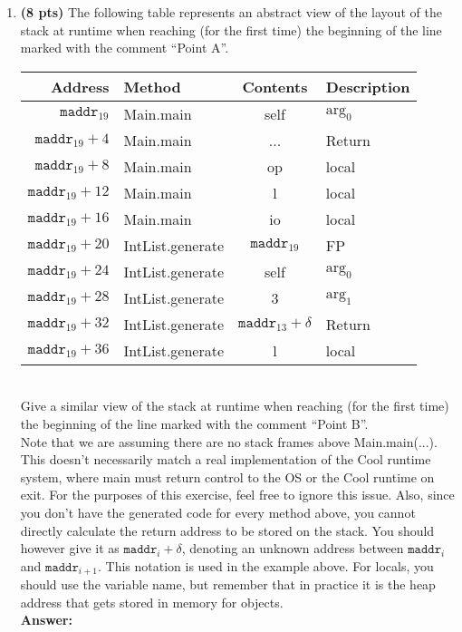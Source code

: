 \documentclass[11pt]{article}
\begin{document}
\begin{enumerate}
\begin{enumerate}
   \newpage

    \item \textbf{(8 pts)} The following table represents an abstract view of the layout of the stack at runtime when reaching (for the first time) the beginning of the line marked with the comment ``Point A''. \\
    
    \begin{tabular}{ | r | l | c | l | }
    \hline
    Address & Method & Contents & Description \\
    \hline
    $\mathtt{maddr}_{19}$ & Main.main & self & $\mbox{arg}_0$ \\
    \hline
    $\mathtt{maddr}_{19}+4$ & Main.main & ... & Return \\
    \hline
    $\mathtt{maddr}_{19}+8$ & Main.main & op & local \\
    \hline
    $\mathtt{maddr}_{19}+12$ & Main.main & l & local \\
    \hline
    $\mathtt{maddr}_{19}+16$ & Main.main & io & local \\
    \hline
    $\mathtt{maddr}_{19}+20$ & IntList.generate & $\mathtt{maddr}_{19}$ & FP \\
    \hline
    $\mathtt{maddr}_{19}+24$ & IntList.generate & self & $\mbox{arg}_0$ \\
    \hline
    $\mathtt{maddr}_{19}+28$ & IntList.generate & 3 & $\mbox{arg}_1$ \\
    \hline
    $\mathtt{maddr}_{19}+32$ & IntList.generate & $\mathtt{maddr}_{13}+\delta$ & Return \\
    \hline
    $\mathtt{maddr}_{19}+36$ & IntList.generate & l & local \\
    \hline
    \end{tabular} \\
    
    Give a similar view of the stack at runtime when reaching (for the first time) the beginning of the line marked with the comment ``Point B''.\\

    Note that we are assuming there are no stack frames above Main.main(...). This doesn't necessarily match a real implementation of the Cool runtime system, where main must return control to the OS or the Cool runtime on exit. For the purposes of this exercise, feel free to ignore this issue. Also, since you don't have the generated code for every method above, you cannot directly calculate the return address to be stored on the stack. You should however give it as $\mathtt{maddr}_{i}+\delta$, denoting an unknown address between $\mathtt{maddr}_{i}$ and $\mathtt{maddr}_{i+1}$. This notation is used in the example above. For locals, you should use the variable name, but remember that in practice it is the heap address that gets stored in memory for objects.\\
    \textbf{Answer:} 
    

\end{enumerate}
\end{enumerate}
\end{document}
